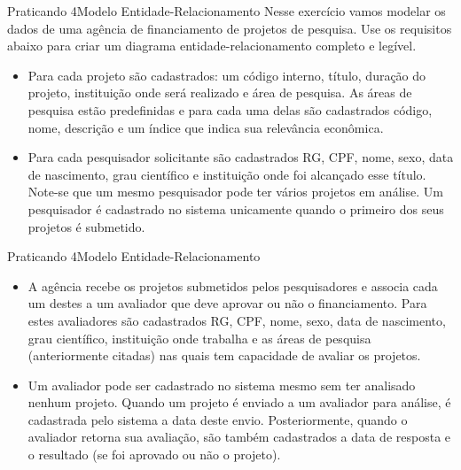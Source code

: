 \documentclass[t]{beamer}
\begin{document}

\begin{ftst}{Praticando 4}{Modelo Entidade-Relacionamento}
Nesse exercício vamos modelar os dados de uma agência de financiamento de projetos de pesquisa. Use os requisitos abaixo para criar um diagrama entidade-relacionamento completo e legível.
\vone
\small
\begin{itemize}
    \item Para cada projeto são cadastrados: um código interno, título, duração do projeto, instituição onde será realizado e área de pesquisa. As áreas de pesquisa estão predefinidas e para cada uma delas são cadastrados código, nome, descrição e um índice que indica sua relevância econômica. 
    \vone
    \item Para cada pesquisador solicitante são cadastrados RG, CPF, nome, sexo, data de nascimento, grau científico e instituição onde foi alcançado esse título. Note-se que um mesmo pesquisador pode ter vários projetos em análise. Um pesquisador é cadastrado no sistema unicamente quando o primeiro dos seus projetos é submetido.
\end{itemize}

\end{ftst}

\begin{ftst}{Praticando 4}{Modelo Entidade-Relacionamento}
\small
\begin{itemize}
    \item A agência recebe os projetos submetidos pelos pesquisadores e associa cada um destes a um avaliador que deve aprovar ou não o financiamento. Para estes avaliadores são cadastrados RG, CPF, nome, sexo, data de nascimento, grau científico, instituição onde trabalha e as áreas de pesquisa (anteriormente citadas) nas quais tem capacidade de avaliar os projetos.
    \vone
    \item Um avaliador pode ser cadastrado no sistema mesmo sem ter analisado nenhum projeto. Quando um projeto é enviado a um avaliador para análise, é cadastrada pelo sistema a data deste envio. Posteriormente, quando o avaliador retorna sua avaliação, são também cadastrados a data de resposta e o resultado (se foi aprovado ou não o projeto).
\end{itemize}
\end{ftst}
\end{document}
